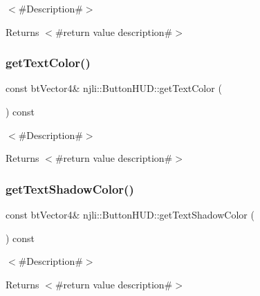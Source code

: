 $<$\#\+Description\#$>$

\begin{DoxyReturn}{Returns}
$<$\#return value description\#$>$ 
\end{DoxyReturn}
\mbox{\label{classnjli_1_1_button_h_u_d_a0216f72b83c5d25ed269d5d18b58f4ac}} 
\subsubsection{\texorpdfstring{get\+Text\+Color()}{getTextColor()}}
{\footnotesize\ttfamily const bt\+Vector4\& njli\+::\+Button\+H\+U\+D\+::get\+Text\+Color (\begin{DoxyParamCaption}{ }\end{DoxyParamCaption}) const}

$<$\#\+Description\#$>$

\begin{DoxyReturn}{Returns}
$<$\#return value description\#$>$ 
\end{DoxyReturn}
\mbox{\label{classnjli_1_1_button_h_u_d_a990306059d39800f64dc3d02a12f2dda}} 
\subsubsection{\texorpdfstring{get\+Text\+Shadow\+Color()}{getTextShadowColor()}}
{\footnotesize\ttfamily const bt\+Vector4\& njli\+::\+Button\+H\+U\+D\+::get\+Text\+Shadow\+Color (\begin{DoxyParamCaption}{ }\end{DoxyParamCaption}) const}

$<$\#\+Description\#$>$

\begin{DoxyReturn}{Returns}
$<$\#return value description\#$>$ 
\end{DoxyReturn}
\mbox{\label{classnjli_1_1_button_h_u_d_add116dc958c02dbc33d7e686c4aff429}} 
